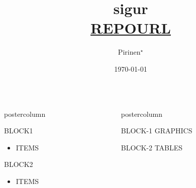 \documentclass[final,hyperref={pdfpagelabels}]{beamer}
\title[SHORTsigur]{{\huge sigur}\\
\url{REPOURL}}
\author[EMAIL]{Pirinen$^\star$ }
\institute[SHORTAFFILIATION]{$^\star$ AFFILIATION1,AFFILIATION2}
\date{\today}
\newlength{\columnheight}
\begin{document}
\begin{frame}
      \begin{columns}
      \begin{column}{.49\textwidth}
      \begin{beamercolorbox}[center,wd=\textwidth]{postercolumn}
          \begin{minipage}[T]{.95\textwidth}  %
          \parbox[t][\columnheight]{\textwidth}{ %
        \begin{block}{BLOCK1}
            \begin{itemize}
                \item ITEMS
            \end{itemize}
        \end{block}

        \begin{block}{BLOCK2}
            \begin{itemize}
                \item ITEMS
            \end{itemize}
        \end{block}

         }
        \end{minipage}
      \end{beamercolorbox}
  \end{column}

   \begin{column}{.49\textwidth}
      \begin{beamercolorbox}[center,wd=\textwidth]{postercolumn}
        \begin{minipage}[T]{.95\textwidth} %
          \parbox[t][\columnheight]{\textwidth}{ %

        \begin{block}{BLOCK-1}
            GRAPHICS
        \end{block}

        \begin{block}{BLOCK-2}
            TABLES
        \end{block}

         }
        \end{minipage}
      \end{beamercolorbox}
    \end{column}
  \end{columns}

  \end{frame}
\end{document}
